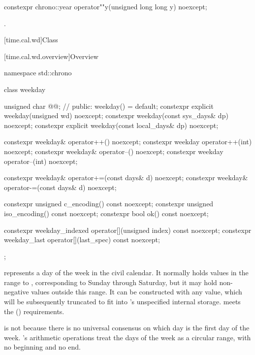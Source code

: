 %
\begin{itemdecl}
constexpr chrono::year operator""y(unsigned long long y) noexcept;
\end{itemdecl}

\begin{itemdescr}
\pnum
\returns
{}.
\end{itemdescr}

[time.cal.wd]{Class }

[time.cal.wd.overview]{Overview}

\begin{codeblock}
namespace std::chrono {
  class weekday {
    unsigned char @@;          // \expos
  public:
    weekday() = default;
    constexpr explicit weekday(unsigned wd) noexcept;
    constexpr weekday(const sys_days& dp) noexcept;
    constexpr explicit weekday(const local_days& dp) noexcept;

    constexpr weekday& operator++()    noexcept;
    constexpr weekday  operator++(int) noexcept;
    constexpr weekday& operator--()    noexcept;
    constexpr weekday  operator--(int) noexcept;

    constexpr weekday& operator+=(const days& d) noexcept;
    constexpr weekday& operator-=(const days& d) noexcept;

    constexpr unsigned c_encoding() const noexcept;
    constexpr unsigned iso_encoding() const noexcept;
    constexpr bool ok() const noexcept;

    constexpr weekday_indexed operator[](unsigned index) const noexcept;
    constexpr weekday_last    operator[](last_spec) const noexcept;
  };
}
\end{codeblock}

\pnum
{} represents a day of the week in the civil calendar.
It normally holds values in the range  to ,
corresponding to Sunday through Saturday, but
it may hold non-negative values outside this range.
It can be constructed with any  value,
which will be subsequently truncated to fit into 's unspecified internal storage.
 meets the  () requirements.
\begin{note}
 is not
because there is no universal consensus on which day is the first day of the week.
's arithmetic operations treat the days of the week as a circular range,
with no beginning and no end.
\end{note}

